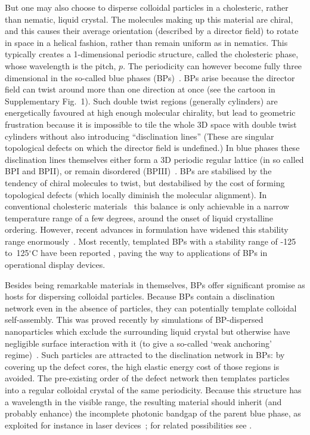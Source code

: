\documentclass[12pt]{article}
\begin{document}
But one may also choose to disperse colloidal particles in a cholesteric, 
rather than nematic, liquid crystal. The molecules making up this material are
chiral, and this causes their average orientation (described by a director field) to rotate in space in
a helical fashion, rather than remain uniform as in nematics. 
This typically creates a 1-dimensional periodic structure, called the cholesteric phase, whose wavelength 
is the pitch, $p$. The periodicity can however become fully three dimensional in the so-called blue phases (BPs)~\cite{mermin}. BPs arise because the director field can twist around more than one direction at once (see 
the cartoon in Supplementary Fig.~1). Such double twist 
regions (generally cylinders) are energetically favoured at high enough molecular chirality, but
lead to geometric frustration because it is impossible to tile the whole 3D
space with double twist cylinders without also introducing ``disclination lines'' 
(These are singular topological defects on which the director field is 
undefined.) In blue phases these disclination lines themselves either form a 3D periodic regular lattice (in so called BPI and BPII), or remain disordered (BPIII)~\cite{bp3}. 
%
BPs are stabilised by the tendency of chiral molecules to twist, but destabilised by the cost of forming topological defects (which locally diminish the molecular alignment). In conventional cholesteric materials~\cite{mermin} this balance is only achievable in a narrow temperature range of a few degrees, around the onset of liquid crystalline ordering.
However, recent advances in formulation have widened this stability
range enormously~\cite{kikuchi,bplasers,coleswidetrange,bpdevice}. Most
recently, templated BPs with a stability range of -125
to~125$^\circ$C have been reported \cite{coles}, paving the way to
applications of BPs in operational display devices.

Besides being remarkable materials in themselves, BPs offer significant promise as hosts for dispersing colloidal particles. Because BPs contain a disclination network even in the absence of
particles, they can potentially template colloidal self-assembly. 
This was proved recently by simulations of BP-dispersed nanoparticles which 
exclude the surrounding liquid crystal but otherwise have negligible surface 
interaction with it (to give a so-called `weak anchoring' regime)~\cite{extrareference1,miha}. 
Such particles are attracted to the disclination network in BPs: by covering up the defect cores, the high elastic energy cost of those regions is avoided. The pre-existing order of the defect network then templates particles into a regular colloidal crystal of the same periodicity. 
Because this structure has a wavelength in the visible range, 
the resulting material should inherit (and probably enhance) the incomplete photonic bandgap of the parent blue phase, as exploited for instance in laser devices~\cite{bplasers}; for related possibilities see \cite{lavrentovich}.
\end{document}
